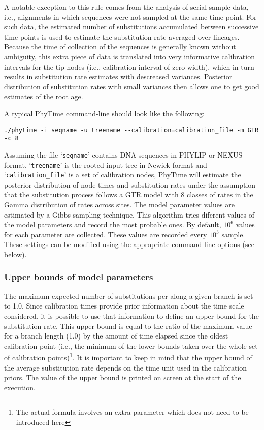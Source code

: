 \documentclass[a4paper,12pt]{article}
\newcommand{\x}[1]{\texttt{#1}}
\begin{document}
\begin{itemize}
A notable exception to this rule comes from the analysis of serial sample 
data, i.e., alignments in which sequences were not sampled at the same time point.  For such data,
the estimated number of substitutions accumulated between successive time points is used to estimate
the substitution rate averaged over lineages. Because the time of collection of the sequences is
generally known without ambiguity, this extra piece of data is translated into very informative
calibration intervals for the tip nodes (i.e., calibration interval of zero width), which in turn
results in substitution rate estimates with descreased variances.  Posterior distribution of
substitution rates with small variances then allows one to get good estimates of the root age.

\end{itemize}

A typical PhyTime command-line should look like the following\index{command-line options!\x{--calibration}}:

\begin{Verbatim}[fontsize=\small]
./phytime -i seqname -u treename --calibration=calibration_file -m GTR -c 8
\end{Verbatim}

Assuming the file `\x{seqname}' contains DNA  sequences in PHYLIP or NEXUS format, `\x{treename}' is
the rooted  input tree in Newick  format and `\x{calibration\_file}'  is a set of  calibration nodes,
PhyTime will  estimate the  posterior distribution of  node times  and substitution rates  under the
assumption that the  substitution process follows a GTR  model with 8 classes of rates  in the Gamma
distribution of  rates across sites. The  model parameter values  are estimated by a  Gibbs sampling
technique. This algorithm tries diferent values of the model parameters and record the most probable
ones. By default,  $10^6$ values for each  parameter are collected. These values  are recorded every
$10^3$  sample. These  settings can  be  modified using  the appropriate  command-line options  (see
below).


\subsubsection{Upper bounds of model parameters}

The  maximum expected  number  of substitutions  per  along a  given  branch is  set  to 1.0.  Since
calibration times provide prior  information about the time scale considered, it  is possible to use
that information to  define an upper bound for  the substitution rate. This upper bound  is equal to
the ratio of  the maximum value for  a branch length (1.0) by  the amount of time  elapsed since the
oldest  calibration point  (i.e., the  minimum  of the  lower bounds  taken  over the  whole set  of
calibration points)\footnote{The actual  formula involves an extra parameter which  does not need to
be  introduced  here}. It  is  important  to keep  in  mind  that the  upper  bound  of the  average
substitution rate depends  on the time unit used  in the calibration priors. The value  of the upper
bound is printed on screen at the start of the execution.
\end{document}
